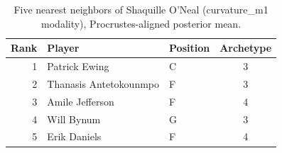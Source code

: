 \begin{table}[htbp]
  \centering\small
  \begin{tabular}{rllc}
    \toprule
    Rank & Player & Position & Archetype \\
    \midrule
    1 & Patrick Ewing & C & 3 \\
    2 & Thanasis Antetokounmpo & F & 3 \\
    3 & Amile Jefferson & F & 4 \\
    4 & Will Bynum & G & 3 \\
    5 & Erik Daniels & F & 4 \\
    \bottomrule
  \end{tabular}
  \caption{Five nearest neighbors of Shaquille O'Neal (curvature_m1 modality), Procrustes-aligned posterior mean.}
  \label{tab:Shaquille_O_Neal_neighbors_curvature_m1}
\end{table}

